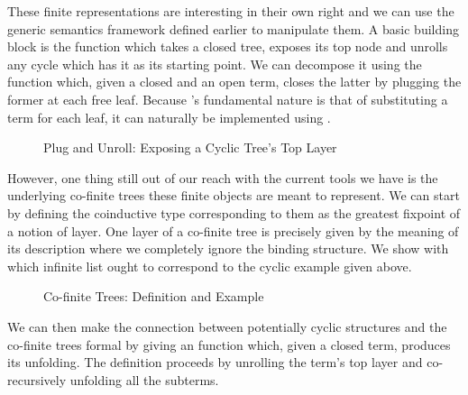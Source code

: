These finite representations are interesting in their own right
and we can use the generic semantics framework defined earlier
to manipulate them. A basic building block is the 
function which takes a closed tree, exposes its top node and
unrolls any cycle which has it as its starting point. We can
decompose it using the  function which, given a closed
and an open term, closes the latter by plugging the former at
each free  leaf. Because 's fundamental nature
is that of substituting a term for each leaf, it can naturally
be implemented using .

\begin{figure}[h]
\begin{minipage}{0.52\textwidth}
\end{minipage}\hspace{2em}
\begin{minipage}{0.43\textwidth}
\end{minipage}
\caption{Plug and Unroll: Exposing a Cyclic Tree's Top Layer}
\end{figure}

However, one thing still out of our reach with the current tools we have
is the underlying co-finite trees these finite objects are meant
to represent. We can start by defining the coinductive type
corresponding to them as the greatest fixpoint of a notion of
layer. One layer of a co-finite tree is precisely given by the
meaning of its description where we completely ignore the binding
structure. We show with  which infinite list ought to
correspond to the cyclic example  given above.

\begin{figure}[h]
\begin{minipage}{0.55\textwidth}
\end{minipage}\hspace{2em}
\begin{minipage}{0.35\textwidth}
\end{minipage}
\caption{Co-finite Trees: Definition and Example}
\end{figure}

We can then make the connection between potentially cyclic
structures and the co-finite trees formal by giving an 
function which, given a closed term, produces its unfolding.
The definition proceeds by unrolling the term's top layer and
co-recursively unfolding all the subterms.


